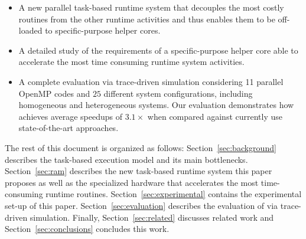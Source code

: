 \begin{itemize}

\item A new parallel task-based runtime system that decouples the most costly routines from the other runtime activities and thus enables them to be off-loaded to specific-purpose helper cores.

\item A detailed study of the requirements of a specific-purpose helper core able to accelerate the most time consuming runtime system activities. 

\item A complete evaluation via trace-driven simulation considering 11 parallel OpenMP codes and $25$ different system configurations, including homogeneous and heterogeneous systems. %
Our evaluation demonstrates how {\proposal} achieves average speedups of $3.1\times$ when compared against currently use state-of-the-art approaches.

\end{itemize} 

The rest of this document is organized as follows: 
Section~\ref{sec:background} describes the task-based execution model and its main bottlenecks.
Section~\ref{sec:ram} describes the new task-based runtime system this paper proposes as well as the specialized hardware that accelerates the most time-consuming runtime routines.
Section~\ref{sec:experimental} contains the experimental set-up of this paper.
Section~\ref{sec:evaluation} describes the evaluation of {\proposal} via trace-driven simulation.
Finally, Section~\ref{sec:related} discusses related work and Section~\ref{sec:conclusions} concludes this work.

